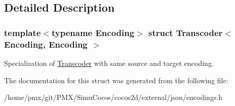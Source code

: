 \subsection{Detailed Description}
\subsubsection*{template$<$typename Encoding$>$\newline
struct Transcoder$<$ Encoding, Encoding $>$}

Specialization of \hyperlink{structTranscoder}{Transcoder} with same source and target encoding. 

The documentation for this struct was generated from the following file\+:\begin{DoxyCompactItemize}
\item 
/home/pmx/git/\+P\+M\+X/\+Simu\+Cocos/cocos2d/external/json/encodings.\+h\end{DoxyCompactItemize}

